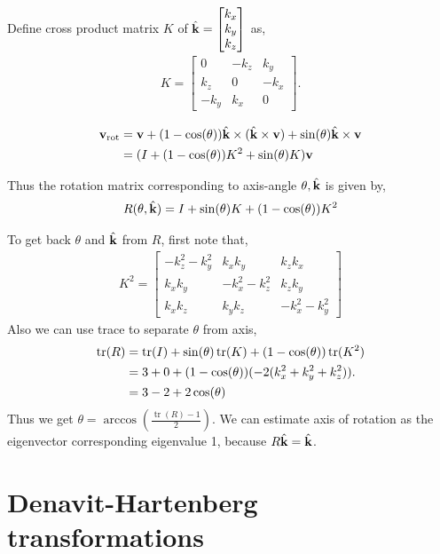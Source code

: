 \documentclass[twocolumn]{article}
\DeclareMathOperator{\tr}{tr}
\begin{document}
Define  cross  product matrix $K$  of $\hat{\mathbf{k}} = \begin{bmatrix}  k_x \\ k_y
  \\ k_z \end{bmatrix}$  as,
\begin{align}
  K  = \begin{bmatrix}
    0   & - k_z & k_y   \\
    k_z   & 0 & -k_x   \\
    -k_y   & k_x & 0
  \end{bmatrix}.
\end{align}

\begin{align}
\mathbf{v}_{\text{rot}} &=  \mathbf{v} + (1-\cos(\theta)) \hat{\mathbf{k}} \times (\hat{\mathbf{k}} \times \mathbf{v}) +  \sin(\theta) \hat{\mathbf{k}} \times \mathbf{v}
                    \notag\\
  &= (I + (1 -\cos(\theta)) K^2  + \sin(\theta) K)\mathbf{v}
\end{align}

Thus the rotation matrix corresponding  to axis-angle $\theta, \hat{\mathbf{k}}$ is
given by,
%
\begin{align}
  R(\theta, \hat{\mathbf{k}}) = I + \sin(\theta)K + (1-\cos(\theta))K^2
\end{align}
%

To get back $\theta$ and $\hat{\mathbf{k}}$   from $R$,  first  note that,
% 
\begin{align}
  K^2 =  \begin{bmatrix}
    -k_z^2  - k_y^2  & k_x k_y & k_z k_x \\
    k_xk_y  & -k_x^2- k_z^2 & k_z k_y \\
    k_x k_z  & k_y k_z &  -k_x^2  - k_y^2
    \end{bmatrix} 
\end{align}
% 
Also we can use trace to separate $\theta$ from axis,
%
\begin{align}
  \tr(R) &= \tr(I)  + \sin(\theta)\tr(K) + (1-\cos(\theta))\tr(K^2)
  \notag\\
  &= 3 + 0 + (1-\cos(\theta))(-2(k_x^2 + k_y^2 + k_z^2)).
    \notag\\
  &= 3 - 2 +2\cos(\theta)
\end{align}
%
Thus we get $\theta  =  \arccos(\frac{\tr(R)-1}{2})$. We can estimate axis of
rotation as the  eigenvector corresponding  eigenvalue 1,   because $R\hat{\mathbf{k}}
= \hat{\mathbf{k}}$.

\section{Denavit-Hartenberg  transformations}
\end{document}
